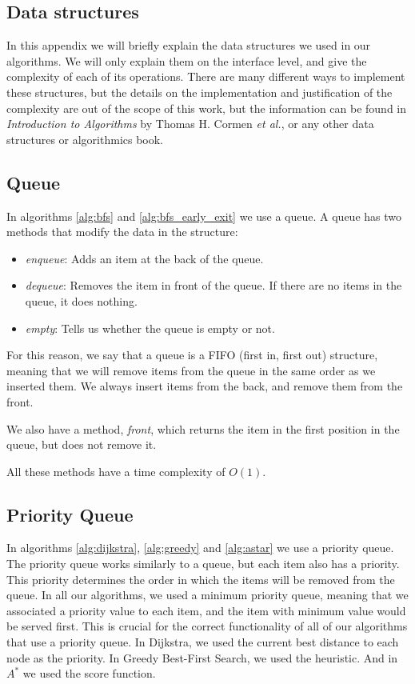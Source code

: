 \documentclass[a4paper,10pt]{report}
\begin{document}
\begin{appendices}

\chapter{Data structures}

In this appendix we will briefly explain the data structures we used in our algorithms. We will only explain them on the interface level, and give the complexity of each of its operations. There are many different ways to implement these structures, but the details on the implementation and justification of the complexity are out of the scope of this work, but the information can be found in \emph{Introduction to Algorithms} by Thomas H. Cormen \textit{et al.}, or any other data structures or algorithmics book.

\section{Queue}
\label{annex:queue}
In algorithms \ref{alg:bfs} and \ref{alg:bfs_early_exit} we use a queue. A queue has two methods that modify the data in the structure:
\begin{itemize}
\item \emph{enqueue}: Adds an item at the back of the queue.
\item \emph{dequeue}: Removes the item in front of the queue. If there are no items in the queue, it does nothing.
\item \emph{empty}: Tells us whether the queue is empty or not.
\end{itemize}
For this reason, we say that a queue is a FIFO (first in, first out) structure, meaning that we will remove items from the queue in the same order as we inserted them. We always insert items from the back, and remove them from the front.

We also have a method, \emph{front}, which returns the item in the first position in the queue, but does not remove it.

All these methods have a time complexity of $O(1)$.

\section{Priority Queue}
\label{annex:priorityqueue}
In algorithms \ref{alg:dijkstra}, \ref{alg:greedy} and \ref{alg:astar} we use a priority queue. The priority queue works similarly to a queue, but each item also has a priority. This priority determines the order in which the items will be removed from the queue. In all our algorithms, we used a minimum priority queue, meaning that we associated a priority value to each item, and the item with minimum value would be served first. This is crucial for the correct functionality of all of our algorithms that use a priority queue. In Dijkstra, we used the current best distance to each node as the priority. In Greedy Best-First Search, we used the heuristic. And in $A^*$ we used the score function.


\end{appendices}
\end{document}
